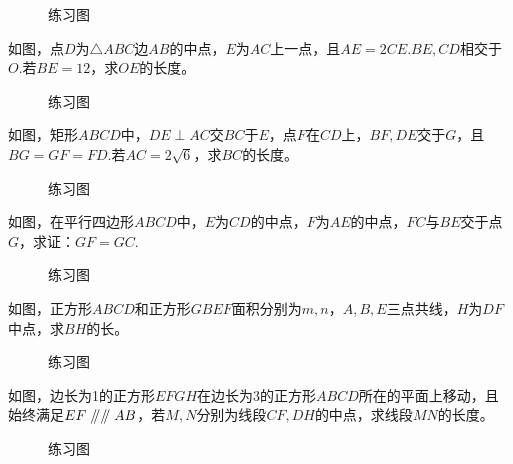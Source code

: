 \begin{figure}[H]
    \centering
    \resizebox{4cm}{!}{}
    \caption{练习图}
\end{figure}
\begin{problem}
如图，点$D$为$\triangle ABC$边$AB$的中点，$E$为$AC$上一点，且$AE=2CE.BE,CD$相交于$O$.若$BE=12$，求$OE$的长度。
\end{problem}
\begin{figure}[H]
    \centering
    \resizebox{4cm}{!}{}
    \caption{练习图}
\end{figure}
\begin{problem}
如图，矩形$ABCD$中，$DE\perp AC$交$BC$于$E$，点$F$在$CD$上，$BF,DE$交于$G$，且$BG=GF=FD.$若$AC=2\sqrt6$，求$BC$的长度。
\end{problem}
\begin{figure}[H]
    \centering
    \resizebox{4cm}{!}{}
    \caption{练习图}
\end{figure}
\begin{problem}
如图，在平行四边形$ABCD$中，$E$为$CD$的中点，$F$为$AE$的中点，$FC$与$BE$交于点$G$，求证：$GF=GC$.
\end{problem}
\begin{figure}[H]
    \centering
    \resizebox{4cm}{!}{}
    \caption{练习图}
\end{figure}
\begin{problem}
如图，正方形$ABCD$和正方形$GBEF$面积分别为$m,n$，$A,B,E$三点共线，$H$为$DF$中点，求$BH$的长。
\end{problem}
\begin{figure}[H]
    \centering
    \resizebox{4cm}{!}{}
    \caption{练习图}
\end{figure}
\begin{problem}
如图，边长为1的正方形$EFGH$在边长为3的正方形$ABCD$所在的平面上移动，且始终满足$EF\mathrel{/\mkern-5mu/} \mathrel{/\mkern-5mu/} AB$，若$M,N$分别为线段$CF,DH$的中点，求线段$MN$的长度。
\end{problem}
\begin{figure}[H]
    \centering
    \resizebox{3cm}{!}{}
    \caption{练习图}
\end{figure}
